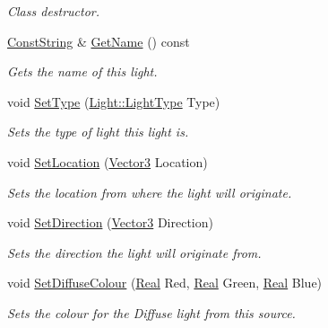 \begin{DoxyCompactItemize}
\begin{DoxyCompactList}\small\item\em Class destructor. \item\end{DoxyCompactList}\item 
\hyperlink{namespacephys_a5ce5049f8b4bf88d6413c47b504ebb31}{ConstString} \& \hyperlink{classphys_1_1Light_a5e85ef1867ad92d589b6cfa96500fcb2}{GetName} () const 
\begin{DoxyCompactList}\small\item\em Gets the name of this light. \item\end{DoxyCompactList}\item 
void \hyperlink{classphys_1_1Light_a87fced0afb0fd44d333c499d41e8568a}{SetType} (\hyperlink{classphys_1_1Light_aef1be63d57f59f33bf4c66be797009bf}{Light::LightType} Type)
\begin{DoxyCompactList}\small\item\em Sets the type of light this light is. \item\end{DoxyCompactList}\item 
void \hyperlink{classphys_1_1Light_a98df6e7c58db78f5543ae7641e904e18}{SetLocation} (\hyperlink{classphys_1_1Vector3}{Vector3} Location)
\begin{DoxyCompactList}\small\item\em Sets the location from where the light will originate. \item\end{DoxyCompactList}\item 
void \hyperlink{classphys_1_1Light_a7020d242add6fe47939b3efb3b207f71}{SetDirection} (\hyperlink{classphys_1_1Vector3}{Vector3} Direction)
\begin{DoxyCompactList}\small\item\em Sets the direction the light will originate from. \item\end{DoxyCompactList}\item 
void \hyperlink{classphys_1_1Light_aa54aed6085b348631daa26bc820bb715}{SetDiffuseColour} (\hyperlink{namespacephys_af7eb897198d265b8e868f45240230d5f}{Real} Red, \hyperlink{namespacephys_af7eb897198d265b8e868f45240230d5f}{Real} Green, \hyperlink{namespacephys_af7eb897198d265b8e868f45240230d5f}{Real} Blue)
\begin{DoxyCompactList}\small\item\em Sets the colour for the Diffuse light from this source. \item\end{DoxyCompactList}\item 

\end{DoxyCompactItemize}
